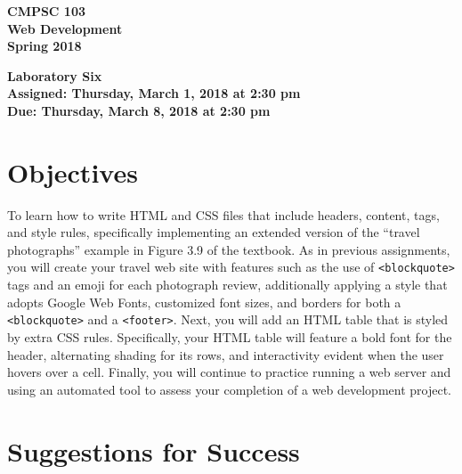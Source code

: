 \documentclass[11pt]{article}
\newcommand{\assignmentduedate}{March 8}
\newcommand{\assignmentassignedate}{March 1}
\newcommand{\assignmentnumber}{Six}
\newcommand{\labyear}{2018}
\newcommand{\labday}{Thursday}
\newcommand{\labtime}{2:30 pm}
\newcommand{\assigneddate}{Assigned: \labday, \assignmentassignedate, \labyear{} at \labtime{}}
\newcommand{\duedate}{Due: \labday, \assignmentduedate, \labyear{} at \labtime{}}
\newcommand{\program}[1]{\lstinline{#1}}
\newcommand{\labtitle}[1]
{
  \begin{center}
    \begin{center}
      \bf
      CMPSC 103\\Web Development\\
      Spring 2018\\
      \medskip
    \end{center}
    \bf
    #1
  \end{center}
}
\begin{document}
\thispagestyle{empty}

\labtitle{Laboratory \assignmentnumber{} \\ \assigneddate{} \\ \duedate{}}

\section*{Objectives}

To learn how to write HTML and CSS files that include headers, content, tags,
and style rules, specifically implementing an extended version of the ``travel
photographs'' example in Figure 3.9 of the textbook. As in previous assignments,
you will create your travel web site with features such as the use of
\program{<blockquote>} tags and an emoji for each photograph review,
additionally applying a style that adopts Google Web Fonts, customized font
sizes, and borders for both a \program{<blockquote>} and a \program{<footer>}.
Next, you will add an HTML table that is styled by extra CSS rules.
Specifically, your HTML table will feature a bold font for the header,
alternating shading for its rows, and interactivity evident when the user hovers
over a cell. Finally, you will continue to practice running a web server and
using an automated tool to assess your completion of a web development project.

\section*{Suggestions for Success}
\end{document}
